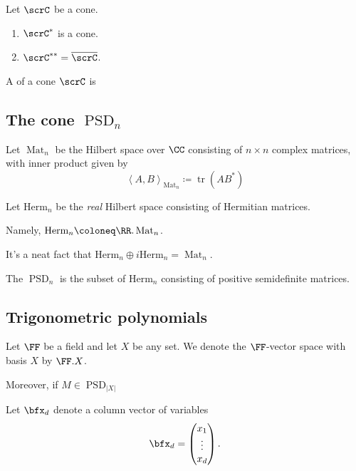 \documentclass{article}
\newcommand{\ip}[1]{\ensuremath{\left\langle{#1}\right\rangle}}
\DeclareMathOperator{\PSD}{PSD}
\DeclareMathOperator{\Mat}{Mat}
\newcommand*\Herm{\ensuremath{\text{Herm}}}
\DeclareMathOperator{\tr}{tr}
\begin{document}
\begin{proposition}
    Let $\scrC$ be a cone.
    \begin{enumerate}[label=(\roman*)]
        \item 
            $\scrC^\ast$ is a cone.
        \item 
            $\scrC^{\ast\ast} = \overline{\scrC}$.
    \end{enumerate}
\end{proposition}

\begin{definition}
    A  of a cone $\scrC$ is
\end{definition}

\subsection{The cone \texorpdfstring{$\PSD_n$}{PSDn}}

\begin{definition}
    Let $\Mat_n$ be the Hilbert space over $\CC$ consisting of $n \times n$ complex matrices, with inner product given by
    \[
        \ip{A,B}_{\Mat_n}
        \coloneq
        \tr (AB^\ast)
    \]
\end{definition}

Let $\Herm_n$ be the \textit{real} Hilbert space consisting of Hermitian matrices.

Namely, $\Herm_n \coloneq \RR.\Mat_n$.

It's a neat fact that $\Herm_n \oplus i\Herm_n = \Mat_n$.

\begin{definition}
    The  $\PSD_n$ is the subset of $\Herm_n$ consisting of positive semidefinite matrices.
\end{definition}

\subsection{Trigonometric polynomials}

\begin{definition}
    Let $\FF$ be a field and let $X$ be any set.
    We denote the $\FF$-vector space with basis $X$ by $\FF.X$.

    Moreover, if $M \in \PSD_{|X|}$
\end{definition}

\begin{definition}
    Let $\bfx_d$ denote a column vector of variables
    \[
        \bfx_d
        =
        \begin{pmatrix}
            x_1 \\
            \vdots \\
            x_d
        \end{pmatrix}.
    \]
\end{definition}
\end{document}
